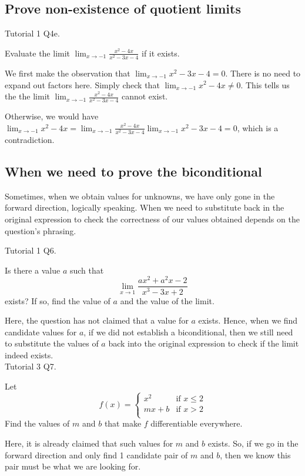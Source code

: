 \documentclass{article}
\begin{document}
\subsection{Prove non-existence of quotient limits}
Tutorial 1 Q4e.

Evaluate the limit $\lim_{x\rightarrow -1}\frac{x^2-4x}{x^2-3x-4}$ if it exists.

We first make the observation that $\lim_{x\rightarrow -1}x^2-3x-4=0$. There is no need to expand out factors here. Simply check that $\lim_{x\rightarrow -1}x^2-4x\neq 0$. This tells us the the limit $\lim_{x\rightarrow -1}\frac{x^2-4x}{x^2-3x-4}$ cannot exist.

Otherwise, we would have $\lim_{x\rightarrow -1}x^2-4x=\lim_{x\rightarrow -1}\frac{x^2-4x}{x^2-3x-4}\lim_{x\rightarrow -1}x^2-3x-4=0$, which is a contradiction.\\

\subsection{When we need to prove the biconditional}
Sometimes, when we obtain values for unknowns, we have only gone in the forward direction, logically speaking. When we need to substitute back in the original expression to check the correctness of our values obtained depends on the question's phrasing.

Tutorial 1 Q6.

Is there a value $a$ such that $$\lim_{x\rightarrow 1}\frac{ax^2+a^2x-2}{x^3-3x+2}$$ exists? If so, find the value of $a$ and the value of the limit.

Here, the question has not claimed that a value for $a$ exists. Hence, when we find candidate values for $a$, if we did not establish a biconditional, then we still need to substitute the values of $a$ back into the original expression to check if the limit indeed exists.
\\

Tutorial 3 Q7.

Let 
$$f(x)=
\begin{cases}
x^2  &\text{if }x\leq 2\\
mx+b &\text{if }x>2\\
\end{cases}
$$
Find the values of $m$ and $b$ that make $f$ differentiable everywhere.

Here, it is already claimed that such values for $m$ and $b$ exists. So, if we go in the forward direction and only find 1 candidate pair of $m$ and $b$, then we know this pair must be what we are looking for.\\
\end{document}
